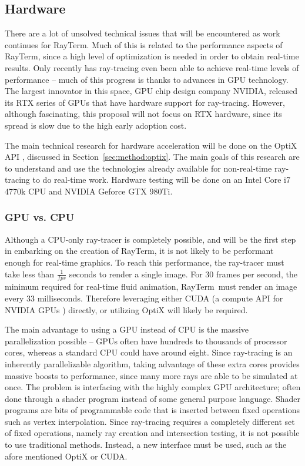\documentclass[11pt]{article}
\newcommand{\name}{{\sc RayTerm}}
\begin{document}
\subsection{Hardware}
\label{sec:method:hardware}

There are a lot of unsolved technical issues that will be encountered as work continues for \name.
Much of this is related to the performance aspects of \name, since a high level of optimization is needed in order to obtain real-time results.
Only recently has ray-tracing even been able to achieve real-time levels of performance -- much of this progress is thanks to advances in GPU technology.
The largest innovator in this space, GPU chip design company NVIDIA, released its RTX series of GPUs that have hardware support for ray-tracing.
However, although fascinating, this proposal will not focus on RTX hardware, since its spread is slow due to the high early adoption cost.

The main technical research for hardware acceleration will be done on the OptiX API \cite{parker2010optix}, discussed in Section~\ref{sec:method:optix}.
The main goals of this research are to understand and use the technologies already available for non-real-time ray-tracing to do real-time work.
Hardware testing will be done on an Intel Core i7 4770k CPU and NVIDIA Geforce GTX 980Ti.

\subsubsection{GPU vs. CPU}
\label{sec:method:gpu_vs_cpu}

Although a CPU-only ray-tracer is completely possible, and will be the first step in embarking on the creation of \name, it is not likely to be performant enough for real-time graphics.
To reach this performance, the ray-tracer must take less than $\frac{1}{f\!\!ps}$ seconds to render a single image.
For $30$ frames per second, the minimum required for real-time fluid animation, \name\ must render an image every $33$ milliseconds.
Therefore leveraging either CUDA (a compute API for NVIDIA GPUs \cite{nvidia2011cuda}) directly, or utilizing OptiX will likely be required.

The main advantage to using a GPU instead of CPU is the massive parallelization possible -- GPUs often have hundreds to thousands of processor cores, whereas a standard CPU could have around eight.
Since ray-tracing is an inherently parallelizable algorithm, taking advantage of these extra cores provides massive boosts to performance, since many more rays are able to be simulated at once.
The problem is interfacing with the highly complex GPU architecture; often done through a shader program instead of some general purpose language.
Shader programs are bits of programmable code that is inserted between fixed operations such as vertex interpolation.
Since ray-tracing requires a completely different set of fixed operations, namely ray creation and intersection testing, it is not possible to use traditional methods.
Instead, a new interface must be used, such as the afore mentioned OptiX or CUDA.
\end{document}
